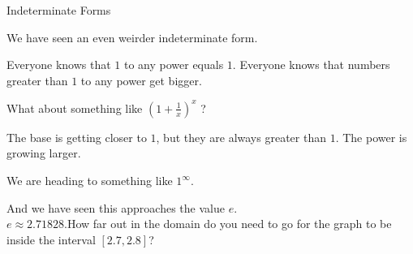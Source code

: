 \documentclass{ximera}
\begin{document}
\begin{example} Indeterminate Forms

We have seen an even weirder indeterminate form.

Everyone knows that $1$ to any power equals $1$. Everyone knows that numbers greater than $1$ to any power get bigger.


What about something like $\left( 1 + \frac{1}{x} \right)^x$ ?

The base is getting closer to $1$, but they are always greater than $1$.  The power is growing larger.  

We are heading to something like $1^{\infty}$.

And we have seen this approaches the value $e$. \\

$e \approx 2.71828. $How far out in the domain do you need to go for the graph to be inside the interval $[2.7, 2.8]$?








\begin{center}
\end{center}









\end{example}
\end{document}

